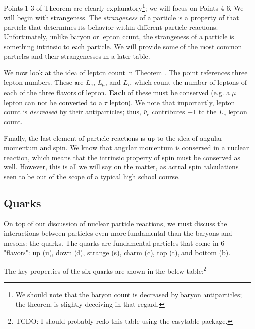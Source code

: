 \documentclass{article}
\begin{document}
\vspace*{10px}
Points 1-3 of Theorem  are clearly explanatory\footnote{We should note that the baryon count is decreased by baryon antiparticles; the theorem is slightly deceiving in that regard.}; we will focus on Points 4-6. We will begin with strangeness. The \textit{strangeness} of a particle is a property of that particle that determines its behavior within different particle reactions. Unfortunately, unlike baryon or lepton count, the strangeness of a particle is something intrinsic to each particle. We will provide some of the most common particles and their strangenesses in a later table. 

\vspace{10px}
We now look at the idea of lepton count in Theorem . The point references three lepton numbers. These are $L_e$, $L_\mu$, and $L_\tau$, which count the number of leptons of each of the three flavors of lepton. \textbf{Each} of these must be conserved (e.g. a $\mu$ lepton can not be converted to a $\tau$ lepton). We note that importantly, lepton count is \textit{decreased} by their antiparticles; thus, $\bar v_e$ contributes $-1$ to the $L_e$ lepton count.

\vspace{10px}
Finally, the last element of particle reactions is up to the idea of angular momentum and spin. We know that angular momentum is conserved in a nuclear reaction, which means that the intrinsic property of spin must be conserved as well. However, this is all we will say on the matter, as actual spin calculations seen to be out of the scope of a typical high school course. 

\newpage
\subsection{Quarks}

On top of our discussion of nuclear particle reactions, we must discuss the interactions between particles even more fundamental than the baryons and mesons: the quarks. The quarks are fundamental particles that come in 6 "flavors": up (u), down (d), strange (s), charm (c), top (t), and bottom (b).

The key properties of the six quarks are shown in the below table:\footnote{TODO: I should probably redo this table using the easytable package. }
\end{document}

